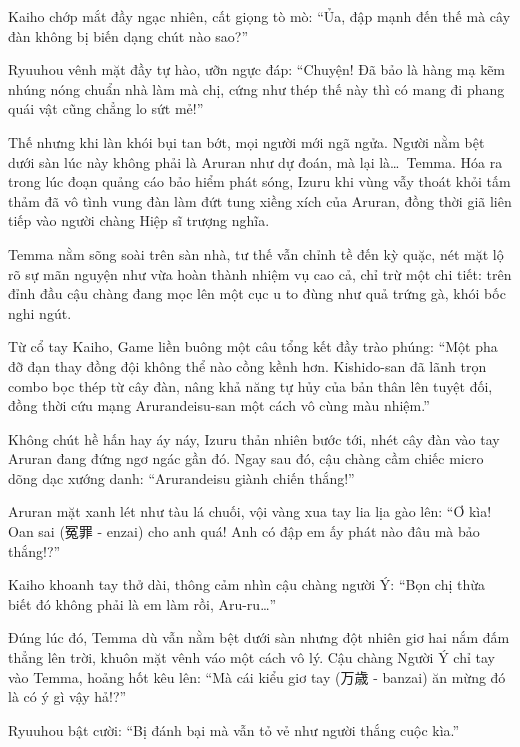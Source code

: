 \documentclass[../main.tex]{subfiles}
\begin{document}

Kaiho chớp mắt đầy ngạc nhiên, cất giọng tò mò: ``Ủa, đập mạnh đến thế mà cây đàn không bị biến dạng chút nào sao?''

Ryuuhou vênh mặt đầy tự hào, ưỡn ngực đáp: ``Chuyện! Đã bảo là hàng mạ kẽm nhúng nóng chuẩn nhà làm mà chị, cứng như thép thế này thì có mang đi phang quái vật cũng chẳng lo sứt mẻ!''

Thế nhưng khi làn khói bụi tan bớt, mọi người mới ngã ngửa. Người nằm bệt dưới sàn lúc này không phải là Aruran như dự đoán, mà lại là\dots\ Temma. Hóa ra trong lúc đoạn quảng cáo bảo hiểm phát sóng, Izuru khi vùng vẫy thoát khỏi tấm thảm đã vô tình vung đàn làm đứt tung xiềng xích của Aruran, đồng thời giã liên tiếp vào người chàng Hiệp sĩ trượng nghĩa.

Temma nằm sõng soài trên sàn nhà, tư thế vẫn chỉnh tề đến kỳ quặc, nét mặt lộ rõ sự mãn nguyện như vừa hoàn thành nhiệm vụ cao cả, chỉ trừ một chi tiết: trên đỉnh đầu cậu chàng đang mọc lên một cục u to đùng như quả trứng gà, khói bốc nghi ngút.


Từ cổ tay Kaiho, Game liền buông một câu tổng kết đầy trào phúng: ``Một pha đỡ đạn thay đồng đội không thể nào cồng kềnh hơn. Kishido-san đã lãnh trọn combo bọc thép từ cây đàn, nâng khả năng tự hủy của bản thân lên tuyệt đối, đồng thời cứu mạng Arurandeisu-san một cách vô cùng màu nhiệm.''

Không chút hề hấn hay áy náy, Izuru thản nhiên bước tới, nhét cây đàn vào tay Aruran đang đứng ngơ ngác gần đó. Ngay sau đó, cậu chàng cầm chiếc micro dõng dạc xướng danh: ``Arurandeisu giành chiến thắng!''

Aruran mặt xanh lét như tàu lá chuối, vội vàng xua tay lia lịa gào lên: ``Ơ kìa! Oan sai (冤罪 - enzai) cho anh quá! Anh có đập em ấy phát nào đâu mà bảo thắng!?''


Kaiho khoanh tay thở dài, thông cảm nhìn cậu chàng người Ý: ``Bọn chị thừa biết đó không phải là em làm rồi, Aru-ru\dots''

Đúng lúc đó, Temma dù vẫn nằm bệt dưới sàn nhưng đột nhiên giơ hai nắm đấm thẳng lên trời, khuôn mặt vênh váo một cách vô lý. Cậu chàng Người Ý chỉ tay vào Temma, hoảng hốt kêu lên: ``Mà cái kiểu giơ tay (万歳 - banzai) ăn mừng đó là có ý gì vậy hả!?''


Ryuuhou bật cười: ``Bị đánh bại mà vẫn tỏ vẻ như người thắng cuộc kìa.''
\end{document}
